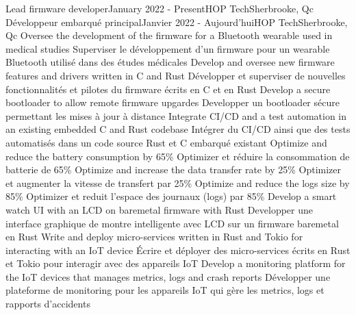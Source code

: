   \resumeSubHeadingListStart
      \resumeSubheadingEnFr
        {Lead firmware developer}{January 2022 - Present}{HOP Tech}{Sherbrooke, Qc}
        {Développeur embarqué principal}{Janvier 2022 - Aujourd'hui}{HOP Tech}{Sherbrooke, Qc}
            \resumeItemListStart
                \resumeItemEnFr
                    {Oversee the development of the firmware for a Bluetooth wearable used in medical studies}
                    {Superviser le développement d'un firmware pour un wearable Bluetooth utilisé dans des études médicales}
                \resumeItemEnFr
                    {Develop and oversee new firmware features and drivers written in C and Rust}
                    {Développer et superviser de nouvelles fonctionnalités et pilotes du firmware écrits en C et en Rust}
                \resumeItemEnFr
                    {Develop a secure bootloader to allow remote firmware upgardes}
                    {Developper un bootloader sécure permettant les mises à jour à distance}
                \resumeItemEnFr
                    {Integrate CI/CD and a test automation in an existing embedded C and Rust codebase}
                    {Intégrer du CI/CD ainsi que des tests automatisés dans un code source Rust et C embarqué existant}
                \resumeItemEnFr
                    {Optimize and reduce the battery consumption by 65\%}
                    {Optimizer et réduire la consommation de batterie de 65\%}
                \resumeItemEnFr
                    {Optimize and increase the data transfer rate by 25\%}
                    {Optimizer et augmenter la vitesse de transfert par 25\%}
                \resumeItemEnFr
                    {Optimize and reduce the logs size by 85\%}
                    {Optimizer et reduit l'espace des journaux (logs) par 85\%}  
                \resumeItemEnFr
                    {Develop a smart watch UI with an LCD on baremetal firmware with Rust}
                    {Developper une interface graphique de montre intelligente avec LCD sur un firmware baremetal en Rust}
                \resumeItemEnFr
                    {Write and deploy micro-services written in Rust and Tokio for interacting with an IoT device}
                    {Écrire et déployer des micro-services écrits en Rust et Tokio pour interagir avec des appareils IoT}
                \resumeItemEnFr
                    {Develop a monitoring platform for the IoT devices that manages metrics, logs and crash reports}
                    {Développer une plateforme de monitoring pour les appareils IoT qui gère les metrics, logs et rapports d'accidents}
